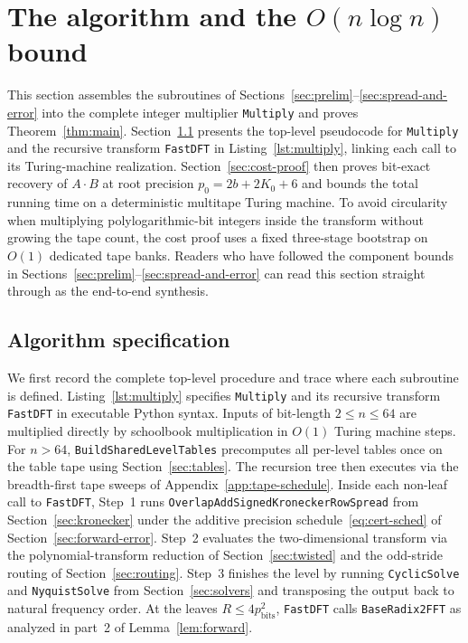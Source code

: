 \section{The algorithm and the \texorpdfstring{$O(n \log n)$}{O(n log n)} bound}\label{sec:main-proof}

This section assembles the subroutines of Sections~\ref{sec:prelim}--\ref{sec:spread-and-error} into the complete integer multiplier \texttt{Multiply} and proves Theorem~\ref{thm:main}. Section~\ref{sec:alg-spec} presents the top-level pseudocode for \texttt{Multiply} and the recursive transform \texttt{FastDFT} in Listing~\ref{lst:multiply}, linking each call to its Turing-machine realization. Section~\ref{sec:cost-proof} then proves bit-exact recovery of $A \cdot B$ at root precision $p_0 = 2b + 2K_0 + 6$ and bounds the total running time on a deterministic multitape Turing machine. To avoid circularity when multiplying polylogarithmic-bit integers inside the transform without growing the tape count, the cost proof uses a fixed three-stage bootstrap on $O(1)$ dedicated tape banks. Readers who have followed the component bounds in Sections~\ref{sec:prelim}--\ref{sec:spread-and-error} can read this section straight through as the end-to-end synthesis.

\subsection{Algorithm specification}\label{sec:alg-spec}

We first record the complete top-level procedure and trace where each subroutine is defined. Listing~\ref{lst:multiply} specifies \texttt{Multiply} and its recursive transform \texttt{FastDFT} in executable Python syntax. Inputs of bit-length $2 \le n \le 64$ are multiplied directly by schoolbook multiplication in $O(1)$ Turing machine steps. For $n > 64$, \texttt{BuildSharedLevelTables} precomputes all per-level tables once on the table tape using Section~\ref{sec:tables}. The recursion tree then executes via the breadth-first tape sweeps of Appendix~\ref{app:tape-schedule}. Inside each non-leaf call to \texttt{FastDFT}, Step~1 runs \texttt{OverlapAddSignedKroneckerRowSpread} from Section~\ref{sec:kronecker} under the additive precision schedule~\eqref{eq:cert-sched} of Section~\ref{sec:forward-error}. Step~2 evaluates the two-dimensional transform via the polynomial-transform reduction of Section~\ref{sec:twisted} and the odd-stride routing of Section~\ref{sec:routing}. Step~3 finishes the level by running \texttt{CyclicSolve} and \texttt{NyquistSolve} from Section~\ref{sec:solvers} and transposing the output back to natural frequency order. At the leaves $R \le 4 p_{\mathrm{bits}}^2$, \texttt{FastDFT} calls \texttt{BaseRadix2FFT} as analyzed in part~2 of Lemma~\ref{lem:forward}.

